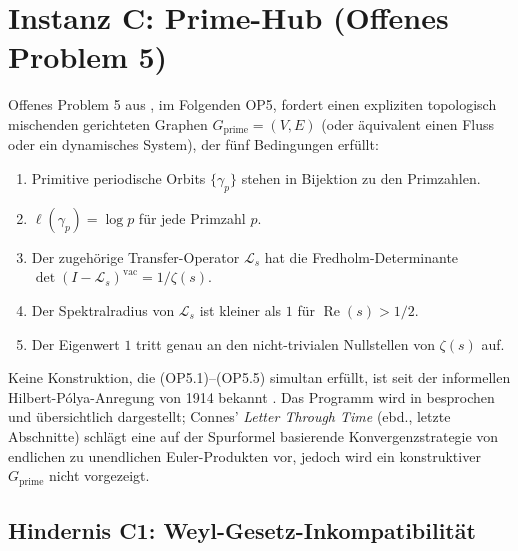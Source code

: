 \documentclass[11pt]{article}
\theoremstyle{definition}
\theoremstyle{remark}
\renewcommand{\Re}{\operatorname{Re}}
\begin{document}
\section{Instanz C: Prime-Hub (Offenes Problem 5)}
\label{sec:primehub}

Offenes Problem 5 aus \cite{Geiger2026RHIII}, im Folgenden OP5, fordert einen
expliziten topologisch mischenden gerichteten Graphen
$G_\mathrm{prime} = (V, E)$ (oder äquivalent einen Fluss oder ein dynamisches System),
der fünf Bedingungen erfüllt:
\begin{enumerate}
\item[(OP5.1)] Primitive periodische Orbits $\{\gamma_p\}$ stehen in
  Bijektion zu den Primzahlen.
\item[(OP5.2)] $\ell(\gamma_p) = \log p$ für jede Primzahl $p$.
\item[(OP5.3)] Der zugehörige Transfer-Operator $\mathcal{L}_s$ hat
  die Fredholm-Determinante $\det(I - \mathcal{L}_s)^{\mathrm{vac}} =
  1/\zeta(s)$.
\item[(OP5.4)] Der Spektralradius von $\mathcal{L}_s$ ist kleiner als $1$
  für $\Re(s) > 1/2$.
\item[(OP5.5)] Der Eigenwert $1$ tritt genau an den nicht-trivialen Nullstellen
  von $\zeta(s)$ auf.
\end{enumerate}
Keine Konstruktion, die (OP5.1)--(OP5.5) simultan erfüllt, ist
seit der informellen Hilbert-P\'olya-Anregung von 1914 bekannt
\cite{Polya1982letter}. Das Programm wird in \cite{Connes2026}
besprochen und übersichtlich dargestellt; Connes' \emph{Letter Through Time}
(ebd., letzte Abschnitte) schlägt eine auf der Spurformel basierende
Konvergenzstrategie von endlichen zu unendlichen Euler-Produkten vor, jedoch wird ein konstruktiver
$G_\mathrm{prime}$ nicht vorgezeigt.

\subsection{Hindernis C1: Weyl-Gesetz-Inkompatibilität}
\label{sec:obs-C1}
\end{document}
